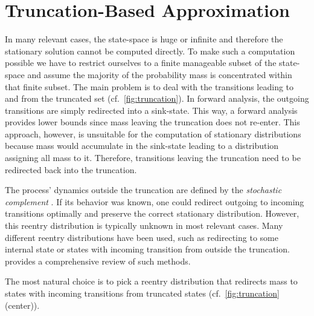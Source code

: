 \section{Truncation-Based Approximation}\label{sec:statagg:fsp}
In many relevant cases, the state-space is huge or infinite and therefore the stationary solution cannot be computed directly.
To make such a computation possible we have to restrict ourselves to a finite manageable subset of the state-space and assume the majority of the probability mass is concentrated within that finite subset.
The main problem is to deal with the transitions leading to and from the truncated set (cf.\ \autoref{fig:truncation}).
In forward analysis, the outgoing transitions are simply redirected into a sink-state.
This way, a forward analysis provides lower bounds since mass leaving the truncation does not re-enter.
This approach, however, is unsuitable for the computation of stationary distributions because mass would accumulate in the sink-state leading to a distribution assigning all mass to it.
Therefore, transitions leaving the truncation need to be redirected back into the truncation.

The process' dynamics outside the truncation are defined by the \emph{stochastic complement} \parencite{spieler2014numerical}.
If its behavior was known, one could redirect outgoing to incoming transitions optimally and preserve the correct stationary distribution.
However, this reentry distribution is typically unknown in most relevant cases.
Many different reentry distributions have been used, such as redirecting to some internal state or states with incoming transition from outside the truncation.
\citet{kuntz2021approximations} provides a comprehensive review of such methods.

The most natural choice is to pick a reentry distribution that redirects mass to states with incoming transitions from truncated states (cf.\ \autoref{fig:truncation} (center)).

